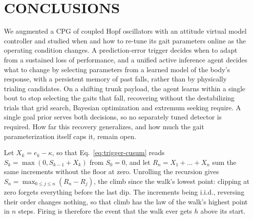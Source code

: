 \documentclass[letterpaper, 10 pt, conference]{ieeeconf}  %
\begin{document}
\section{CONCLUSIONS}
\label{sec:conclusions}

We augmented a CPG of coupled Hopf oscillators with an attitude virtual model controller and studied when and how to re-tune its gait parameters online as the operating condition changes.
A prediction-error trigger decides when to adapt from a sustained loss of performance, and a unified active inference agent decides what to change by selecting parameters from a learned model of the body's response, with a persistent memory of past falls, rather than by physically trialing candidates.
On a shifting trunk payload, the agent learns within a single bout to stop selecting the gaits that fall, recovering without the destabilizing trials that grid search, Bayesian optimization and extremum seeking require.
A single goal prior serves both decisions, so no separately tuned detector is required.
How far this recovery generalizes, and how much the gait parameterization itself caps it, remain open.


\label{appx:fpr}

Let $X_k = e_k - \kappa$, so that Eq.~\ref{eq:trigger-cusum} reads $S_k = \max(0, S_{k-1} + X_k)$ from $S_0 = 0$, and let $R_n = X_1 + \dots + X_n$ sum the same increments without the floor at zero.
Unrolling the recursion gives $S_n = \max_{0 \leq j \leq n}(R_n - R_j)$, the climb since the walk's lowest point: clipping at zero forgets everything before the last dip.
The increments being i.i.d., reversing their order changes nothing, so that climb has the law of the walk's highest point in $n$ steps.
Firing is therefore the event that the walk ever gets $h$ above its start.
\end{document}
